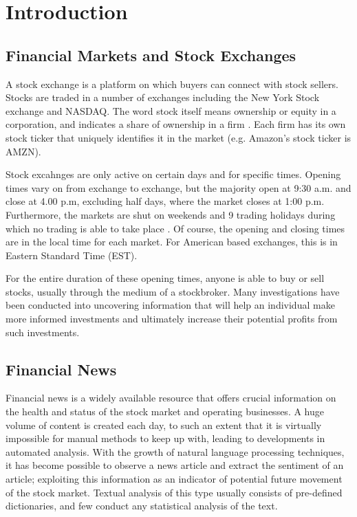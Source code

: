 
\chapter{Introduction}
\label{chap:context}
\section{Financial Markets and Stock Exchanges}
A stock exchange is a platform on which buyers can connect with stock sellers. Stocks are traded in a number of exchanges including the New York Stock exchange and NASDAQ. The word stock itself means ownership or equity in a corporation, and indicates a share of ownership in a firm \parencite{stock-market}. Each firm has its own stock ticker that uniquely identifies it in the market (e.g. Amazon's stock ticker is AMZN).

Stock excahnges are only active on certain days and for specific times. Opening times vary on from exchange to exchange, but the majority open at 9:30 a.m. and close at 4.00 p.m, excluding half days, where the market closes at 1:00 p.m. Furthermore, the markets are shut on weekends and 9 trading holidays during which no trading is able to take place \parencite{stock-opening-hours}. Of course, the opening and closing times are in the local time for each market. For American based exchanges, this is in Eastern Standard Time (EST).

For the entire duration of these opening times, anyone is able to buy or sell stocks, usually through the medium of a stockbroker. Many investigations have been conducted into uncovering information that will help an individual make more informed investments and ultimately increase their potential profits from such investments.

\section{Financial News}
Financial news is a widely available resource that offers crucial information on the health and status of the stock market and operating businesses. A huge volume of content is created each day, to such an extent that it is virtually impossible for manual methods to keep up with, leading to developments in automated analysis. With the growth of natural language processing techniques, it has become possible to observe a news article and extract the sentiment of an article; exploiting this information as an indicator of potential future movement of the stock market. Textual analysis of this type usually consists of pre-defined dictionaries, and few conduct any statistical analysis of the text.

